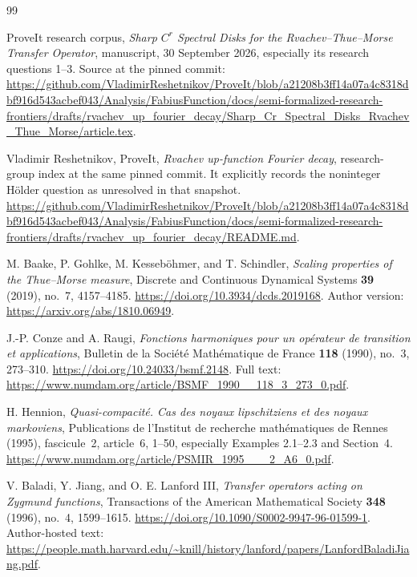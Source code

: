 \documentclass[11pt,a4paper]{article}
\numberwithin{equation}{section}
\theoremstyle{definition}
\theoremstyle{remark}
\begin{document}
\begin{thebibliography}{99}
\small

ProveIt research corpus,
\emph{Sharp $C^r$ Spectral Disks for the Rvachev--Thue--Morse Transfer
Operator}, manuscript, 30 September 2026, especially its research
questions 1--3. Source at the pinned commit:
\url{https://github.com/VladimirReshetnikov/ProveIt/blob/a21208b3ff14a07a4c8318dbf916d543acbef043/Analysis/FabiusFunction/docs/semi-formalized-research-frontiers/drafts/rvachev_up_fourier_decay/Sharp_Cr_Spectral_Disks_Rvachev_Thue_Morse/article.tex}.

Vladimir Reshetnikov, ProveIt,
\emph{Rvachev up-function Fourier decay}, research-group index at the
same pinned commit. It explicitly records the noninteger H\"older
question as unresolved in that snapshot.
\url{https://github.com/VladimirReshetnikov/ProveIt/blob/a21208b3ff14a07a4c8318dbf916d543acbef043/Analysis/FabiusFunction/docs/semi-formalized-research-frontiers/drafts/rvachev_up_fourier_decay/README.md}.

M. Baake, P. Gohlke, M. Kesseb\"ohmer, and T. Schindler,
\emph{Scaling properties of the Thue--Morse measure},
Discrete and Continuous Dynamical Systems \textbf{39} (2019),
no.~7, 4157--4185.
\url{https://doi.org/10.3934/dcds.2019168}.
Author version: \url{https://arxiv.org/abs/1810.06949}.

J.-P. Conze and A. Raugi,
\emph{Fonctions harmoniques pour un op\'erateur de transition et applications},
Bulletin de la Soci\'et\'e Math\'ematique de France \textbf{118}
(1990), no.~3, 273--310.
\url{https://doi.org/10.24033/bsmf.2148}.
Full text: \url{https://www.numdam.org/article/BSMF_1990__118_3_273_0.pdf}.

H. Hennion, \emph{Quasi-compacit\'e. Cas des noyaux lipschitziens et
des noyaux markoviens}, Publications de l'Institut de recherche
math\'ematiques de Rennes (1995), fascicule~2, article~6, 1--50,
especially Examples 2.1--2.3 and Section~4.
\url{https://www.numdam.org/article/PSMIR_1995___2_A6_0.pdf}.

V. Baladi, Y. Jiang, and O. E. Lanford III,
\emph{Transfer operators acting on Zygmund functions},
Transactions of the American Mathematical Society \textbf{348}
(1996), no.~4, 1599--1615.
\url{https://doi.org/10.1090/S0002-9947-96-01599-1}.
Author-hosted text:
\url{https://people.math.harvard.edu/~knill/history/lanford/papers/LanfordBaladiJiang.pdf}.


\end{thebibliography}
\end{document}
